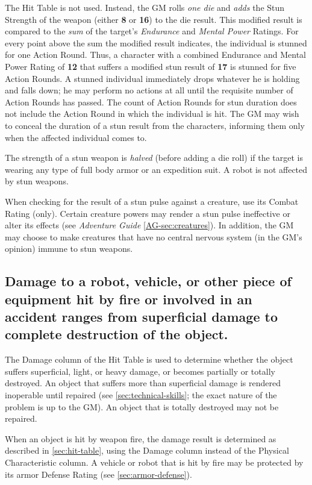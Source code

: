 The Hit Table is not used. Instead, the GM rolls \emph{one die} and
\emph{adds} the Stun Strength of the weapon (either \textbf{8} or
\textbf{16}) to the die result.  This modified result is compared to
the \emph{sum} of the target's \emph{Endurance} and \emph{Mental
  Power} Ratings. For every point above the sum the modified result
indicates, the individual is stunned for one Action Round. Thus, a
character with a combined Endurance and Mental Power Rating of
\textbf{12} that suffers a modified stun result of \textbf{17} is
stunned for five Action Rounds. A stunned individual immediately drops
whatever he is holding and falls down; he may perform no actions at
all until the requisite number of Action Rounds has passed. The count
of Action Rounds for stun duration does not include the Action Round
in which the individual is hit. The GM may wish to conceal the
duration of a stun result from the characters, informing them only
when the affected individual comes to.

The strength of a stun weapon is \emph{halved} (before adding a die
roll) if the target is wearing any type of full body armor or an
expedition suit. A robot is not affected by stun weapons.

When checking for the result of a stun pulse against a creature, use
its Combat Rating (only). Certain creature powers may render a stun
pulse ineffective or alter its effects (see \emph{Adventure Guide} \ref{AG-sec:creatures}). In
addition, the GM may choose to make creatures that have no central
nervous system (in the GM's opinion) immune to stun weapons.

\subsection[Equipment Damage]{Damage to a robot, vehicle, or other
  piece of equipment hit by fire or involved in an accident ranges
  from superficial damage to complete destruction of the object.} 
\label{sec:equipment-damage}

The Damage column of the Hit Table is used to determine whether the
object suffers superficial, light, or heavy damage, or becomes
partially or totally destroyed. An object that suffers more than
superficial damage is rendered inoperable until repaired (see
\ref{sec:technical-skills}; the exact nature of the problem is up to
the GM). An object that is totally destroyed may not be repaired.

When an object is hit by weapon fire, the damage result is determined
as described in \ref{sec:hit-table}, using the Damage column instead
of the Physical Characteristic column. A vehicle or robot that is hit
by fire may be protected by its armor Defense Rating (see
\ref{sec:armor-defense}).

